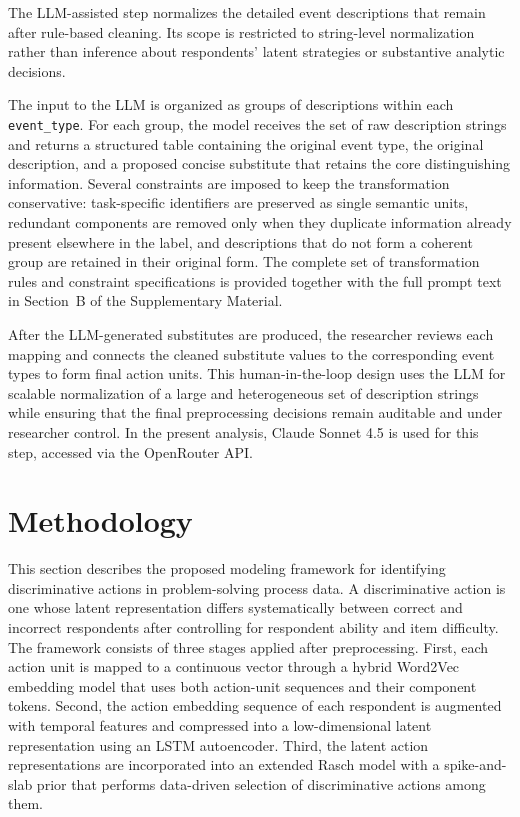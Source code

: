\documentclass[A4paper,11pt]{article}
\begin{document}
The LLM-assisted step normalizes the detailed event descriptions that remain after rule-based cleaning. Its scope is restricted to string-level normalization rather than inference about respondents' latent strategies or substantive analytic decisions.

The input to the LLM is organized as groups of descriptions within each \texttt{event\_type}. For each group, the model receives the set of raw description strings and returns a structured table containing the original event type, the original description, and a proposed concise substitute that retains the core distinguishing information. Several constraints are imposed to keep the transformation conservative: task-specific identifiers are preserved as single semantic units, redundant components are removed only when they duplicate information already present elsewhere in the label, and descriptions that do not form a coherent group are retained in their original form. The complete set of transformation rules and constraint specifications is provided together with the full prompt text in Section~B of the Supplementary Material.

After the LLM-generated substitutes are produced, the researcher reviews each mapping and connects the cleaned substitute values to the corresponding event types to form final action units. This human-in-the-loop design uses the LLM for scalable normalization of a large and heterogeneous set of description strings while ensuring that the final preprocessing decisions remain auditable and under researcher control. In the present analysis, Claude Sonnet 4.5 \citep{anthropic2025sonnet} is used for this step, accessed via the OpenRouter API.

\section{Methodology}


This section describes the proposed modeling framework for identifying discriminative actions in problem-solving process data. A discriminative action is one whose latent representation differs systematically between correct and incorrect respondents after controlling for respondent ability and item difficulty. The framework consists of three stages applied after preprocessing. First, each action unit is mapped to a continuous vector through a hybrid Word2Vec embedding model that uses both action-unit sequences and their component tokens. Second, the action embedding sequence of each respondent is augmented with temporal features and compressed into a low-dimensional latent representation using an LSTM autoencoder. Third, the latent action representations are incorporated into an extended Rasch model with a spike-and-slab prior that performs data-driven selection of discriminative actions among them.
\end{document}
